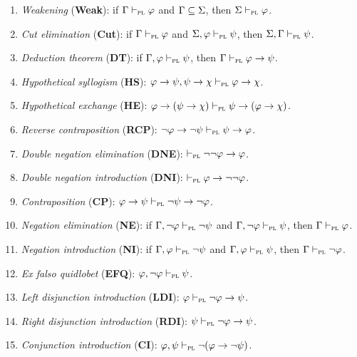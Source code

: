\documentclass[a4paper, 11pt]{article} %
\begin{document}
\begin{enumerate}[itemsep=2pt]\small
  \item \textit{Weakening} (\textbf{Weak}): if $\Gamma \vdash_{\textsc{pl}} \varphi$ and $\Gamma \subseteq \Sigma$, then $\Sigma \vdash_{\textsc{pl}} \varphi$.
  \item \textit{Cut elimination} (\textbf{Cut}): if $\Gamma \vdash_{\textsc{pl}} \varphi$ and $\Sigma, \varphi \vdash_{\textsc{pl}} \psi$, then $\Sigma,\Gamma \vdash_{\textsc{pl}} \psi$.
  \item \textit{Deduction theorem} (\textbf{DT}): if $\Gamma, \varphi \vdash_{\textsc{pl}} \psi$, then $\Gamma \vdash_{\textsc{pl}} \varphi \rightarrow \psi$.
  \item \textit{Hypothetical syllogism} (\textbf{HS}): $\varphi \rightarrow \psi, \psi \rightarrow \chi \vdash_{\textsc{pl}} \varphi \rightarrow \chi$.
  \item \textit{Hypothetical exchange} (\textbf{HE}): $\varphi \rightarrow (\psi \rightarrow \chi) \vdash_{\textsc{pl}} \psi \rightarrow (\varphi \rightarrow \chi)$.
  \item \textit{Reverse contraposition} (\textbf{RCP}): $\neg\varphi \rightarrow \neg\psi \vdash_{\textsc{pl}} \psi \rightarrow \varphi$.
  \item \textit{Double negation elimination} (\textbf{DNE}): $\vdash_{\textsc{pl}} \neg\neg\varphi \rightarrow \varphi$.
  \item \textit{Double negation introduction} (\textbf{DNI}): $\vdash_{\textsc{pl}} \varphi \rightarrow \neg\neg\varphi$.
  \item \textit{Contraposition} (\textbf{CP}): $\varphi \rightarrow \psi \vdash_{\textsc{pl}} \neg\psi \rightarrow \neg\varphi$.
  \item \textit{Negation elimination} (\textbf{NE}): if $\Gamma, \neg\varphi \vdash_{\textsc{pl}} \neg\psi$ and $\Gamma, \neg\varphi \vdash_{\textsc{pl}} \psi$, then $\Gamma \vdash_{\textsc{pl}} \varphi$. 
  \item \textit{Negation introduction} (\textbf{NI}): if $\Gamma, \varphi \vdash_{\textsc{pl}} \neg\psi$ and $\Gamma, \varphi \vdash_{\textsc{pl}} \psi$, then $\Gamma \vdash_{\textsc{pl}} \neg\varphi$. 
  \item \textit{Ex falso quidlobet} (\textbf{EFQ}): $\varphi, \neg\varphi \vdash_{\textsc{pl}} \psi$. 
  \item \textit{Left disjunction introduction} (\textbf{LDI}): $\varphi \vdash_{\textsc{pl}} \neg\varphi \rightarrow \psi$. 
  \item \textit{Right disjunction introduction} (\textbf{RDI}): $\psi \vdash_{\textsc{pl}} \neg\varphi \rightarrow \psi$. 
  \item \textit{Conjunction introduction} (\textbf{CI}): $\varphi, \psi \vdash_{\textsc{pl}} \neg(\varphi \rightarrow \neg\psi)$. 

\end{enumerate}
\end{document}
